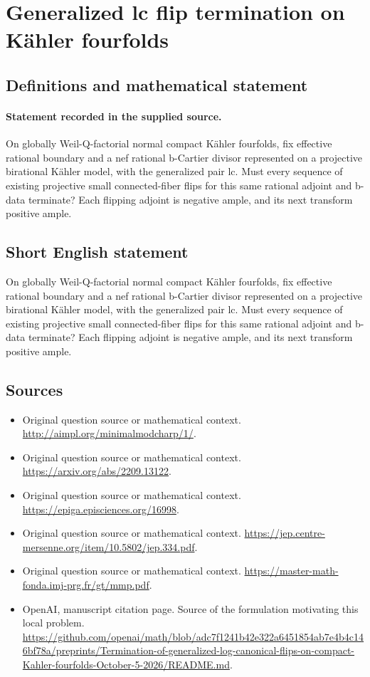 \documentclass[11pt]{article}
\begin{document}
\section*{Generalized lc flip termination on Kähler fourfolds}\label{statement}
\subsection{Definitions and mathematical statement}
\paragraph{Statement recorded in the supplied source.}
On globally Weil-Q-factorial normal compact Kähler fourfolds, fix effective rational boundary and a nef rational b-Cartier divisor represented on a projective birational Kähler model, with the generalized pair lc. Must every sequence of existing projective small connected-fiber flips for this same rational adjoint and b-data terminate? Each flipping adjoint is negative ample, and its next transform positive ample.
\subsection{Short English statement}
On globally Weil-Q-factorial normal compact Kähler fourfolds, fix effective rational boundary and a nef rational b-Cartier divisor represented on a projective birational Kähler model, with the generalized pair lc. Must every sequence of existing projective small connected-fiber flips for this same rational adjoint and b-data terminate? Each flipping adjoint is negative ample, and its next transform positive ample.
\subsection{Sources}
\begin{itemize}
\item[S1] Original question source or mathematical context.
\url{http://aimpl.org/minimalmodcharp/1/}.
\item[S2] Original question source or mathematical context.
\url{https://arxiv.org/abs/2209.13122}.
\item[S3] Original question source or mathematical context.
\url{https://epiga.episciences.org/16998}.
\item[S4] Original question source or mathematical context.
\url{https://jep.centre-mersenne.org/item/10.5802/jep.334.pdf}.
\item[S5] Original question source or mathematical context.
\url{https://master-math-fonda.imj-prg.fr/gt/mmp.pdf}.
\item[S6] OpenAI, manuscript citation page. Source of the formulation motivating this local problem.
\url{https://github.com/openai/math/blob/adc7f1241b42e322a6451854ab7e4b4c146bf78a/preprints/Termination-of-generalized-log-canonical-flips-on-compact-Kahler-fourfolds-October-5-2026/README.md}.
\end{itemize}
\end{document}

